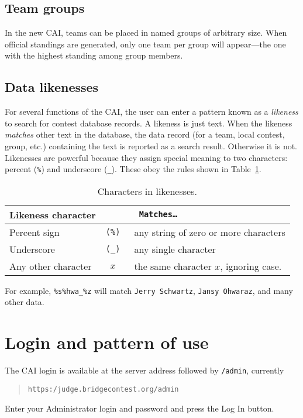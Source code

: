 \documentclass[11pt,letterpaper]{refart}
\def\nada{\hspace{0pt}}
\def\ui#1{\textsf{#1}}
\begin{document}
\subsection{Team groups}
In the new CAI, teams can be placed in named groups of arbitrary size. When
official standings are generated, only one team per group will appear---the
one with the highest standing among group members.

\subsection{Data likenesses}
For several functions of the CAI, the user can enter a pattern known as a \emph{likeness}
to search for contest database records. A likeness is just text. When the likeness
\emph{matches} other text in the database, the data record (for a team, local contest,
group, etc.) containing the text is reported as a search result. Otherwise it is not. 
Likenesses are powerful because they assign special meaning to two characters:
percent (\texttt{\%}) and underscore (\texttt{\_}). These obey the rules shown in
Table~\ref{tbl:likeness}.\
\begin{table}
\centering
\caption{Characters in likenesses.}
\begin{tabular}{l>{\tt}cl}
\multicolumn{2}{l}{\bfseries Likeness character} & {\bfseries Matches\ldots} \\ \hline
Percent sign & (\texttt{\%}\nada) & any string of zero or more characters \\
Underscore  & (\texttt{\_}\nada)  & any single character \\
Any other character & $x$ & the same character $x$, ignoring case.
\end{tabular}
\label{tbl:likeness}
\end{table}

For example, \texttt{\%s\%hwa\_\%z} will match \texttt{Jerry Schwartz},
\texttt{Jansy Ohwaraz}, and many other data.

\section{Login and pattern of use}
The CAI login is available at the server address followed by \texttt{/admin}, currently
\begin{quote} 
\texttt{https:/judge.bridgecontest.org/admin}
\end{quote}
Enter your Administrator login and password and press the \ui{Log In} button.
\end{document}
